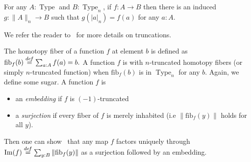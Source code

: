 \documentclass[notfinal]{jfrarticle}
\DeclareMathOperator{\Type}{Type}
\DeclareMathOperator{\HProp}{HProp}
\DeclareMathOperator{\im}{Im}
\newcommand \defeq {\overset{de\hspace{-0.2ex}f}{=}}
\newcommand \squash[1] {\| #1 \| }
\newcommand \fib[2] {\mathrm{fib}_{#1}(#2)}
\begin{document}

\begin{lem}
  For any $A:\Type$ and $B:\Type_n$, if $f:A \to B$ then there is an
  induced $g:\|A\|_n\to B$ such that $g(|a|_n)= f(a)$ for any $a:A$.
\end{lem}
%
We refer the reader to~\cite[7.3]{hottbook} for more details on 
truncations.

%
The homotopy fiber of a function $f$ at element $b$ is
defined as 
$
\fib{f}{b} \defeq \sum_{a:A} f(a) = b.
$
%
A function $f$ is with $n$-truncated homotopy fibers (or simply
$n$-truncated function) when $\fib{f}{b}$
is in $\Type_n$ for any $b$.  
%
Again, we define some sugar. A function $f$ is 
\begin{itemize}
\item an {\em embedding} if $f$ is $(-1)$-truncated
\item a {\em surjection} if every fiber of $f$ is merely inhabited
  (i.e $\|\fib f y\|$ holds for all $y$).
\end{itemize}
Then one can show~\cite[Lemma 7.6.4]{hottbook} that any map $f$
factors uniquely through $\im(f) \defeq \sum_{y:B} \|\fib f y\|$ as a
surjection followed by an embedding.
\end{document}
